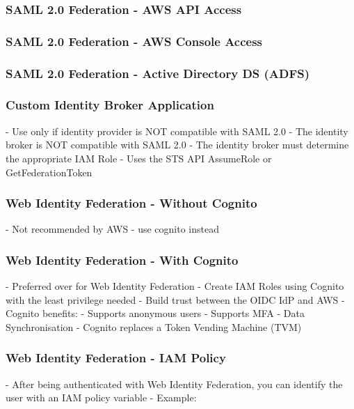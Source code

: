 \documentclass[11pt]{book}
\begin{document}
    \subsubsection{SAML 2.0 Federation - AWS API Access}

    \subsubsection{SAML 2.0 Federation - AWS Console Access}

    \subsubsection{SAML 2.0 Federation - Active Directory DS (ADFS)}

    \subsubsection{Custom Identity Broker Application}
    - Use only if identity provider is NOT compatible with SAML 2.0
    - The identity broker is NOT compatible with SAML 2.0
    - The identity broker must determine the appropriate IAM Role
    - Uses the STS API AssumeRole or GetFederationToken

    \subsubsection{Web Identity Federation - Without Cognito}
    - Not recommended by AWS - use cognito instead

    \subsubsection{Web Identity Federation - With Cognito}
    - Preferred over for Web Identity Federation
    - Create IAM Roles using Cognito with the least privilege needed
    - Build trust between the OIDC IdP and AWS
    - Cognito benefits:
    - Supports anonymous users
    - Supports MFA
    - Data Synchronisation
    - Cognito replaces a Token Vending Machine (TVM)

    \subsubsection{Web Identity Federation - IAM Policy}
    - After being authenticated with Web Identity Federation, you can identify the user with an IAM policy variable
    - Example:
\end{document}
